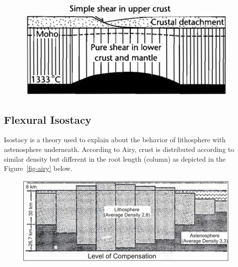 \documentclass[
  letterpaper,
  DIV=11,
  numbers=noendperiod,
  oneside]{scrreprt}
\begin{document}
\begin{figure}


\includegraphics[width=6.72917in,height=\textheight]{./images/image-1564040352.png} \hfill{}

\end{figure}

\hypertarget{flexural-isostacy}{%
\subsection{Flexural Isostacy}\label{flexural-isostacy}}

Isostacy is a theory used to explain about the behavior of lithosphere
with astenosphere underneath. According to Airy, crust is distributed
according to similar density but different in the root length (column)
as depicted in the Figure~\ref{fig-airy} below.

\begin{figure}


\includegraphics[width=6.69792in,height=\textheight]{./images/image-240741717.png} \hfill{}

\end{figure}
\end{document}
